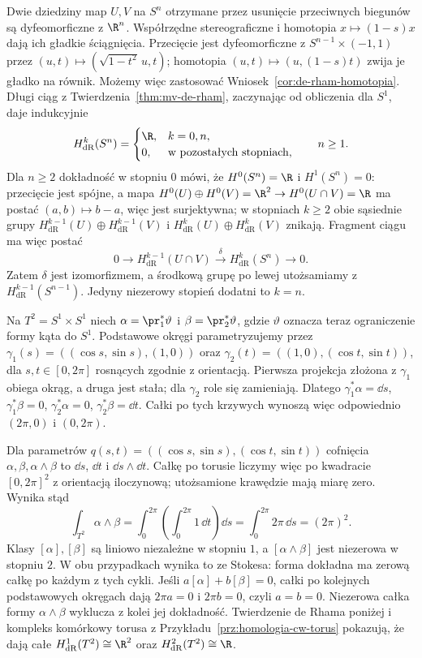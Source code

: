 \begin{przyklad}
\label{prz:de-rham-sfery-torus}
Dwie dziedziny map $U,V$ na $S^n$ otrzymane przez usunięcie
przeciwnych biegunów są dyfeomorficzne z $\R^n$.
Współrzędne stereograficzne i homotopia $x\mapsto(1-s)x$
dają ich gładkie ściągnięcia. Przecięcie jest
dyfeomorficzne z $S^{n-1}\times(-1,1)$ przez
$(u,t)\mapsto(\sqrt{1-t^2}\,u,t)$; homotopia
$(u,t)\mapsto(u,(1-s)t)$ zwija je gładko na równik.
Możemy więc zastosować
Wniosek~\ref{cor:de-rham-homotopia}.
Długi ciąg z
Twierdzenia~\ref{thm:mv-de-rham}, zaczynając od
obliczenia dla $S^1$, daje indukcyjnie
\[
 H^k_{\mathrm{dR}}(S^n)=
 \begin{cases}\R,&k=0,n,\\0,&\text{w pozostałych stopniach,}\end{cases}
 \qquad n\geq1.
\]
Dla $n\geq2$ dokładność w stopniu $0$ mówi,
że $H^0(S^n)=\R$ i $H^1(S^n)=0$:
przecięcie jest spójne, a mapa
$H^0(U)\oplus H^0(V)=\R^2\to H^0(U\cap V)=\R$
ma postać $(a,b)\mapsto b-a$, więc jest surjektywna;
w stopniach $k\geq2$ obie sąsiednie grupy
$H^{k-1}_{\mathrm{dR}}(U)\oplus H^{k-1}_{\mathrm{dR}}(V)$
i $H^k_{\mathrm{dR}}(U)\oplus H^k_{\mathrm{dR}}(V)$
znikają. Fragment ciągu ma więc postać
\[
 0\longrightarrow H^{k-1}_{\mathrm{dR}}(U\cap V)
 \xrightarrow{\delta}H^k_{\mathrm{dR}}(S^n)
 \longrightarrow0.
\]
Zatem $\delta$ jest izomorfizmem, a środkową grupę
po lewej utożsamiamy z $H^{k-1}_{\mathrm{dR}}(S^{n-1})$.
Jedyny niezerowy stopień dodatni to $k=n$.

Na $T^2=S^1\times S^1$ niech
$\alpha=\pr_1^*\vartheta$ i
$\beta=\pr_2^*\vartheta$, gdzie $\vartheta$ oznacza
teraz ograniczenie formy kąta do $S^1$.
Podstawowe okręgi parametryzujemy przez
$\gamma_1(s)=((\cos s,\sin s),(1,0))$ oraz
$\gamma_2(t)=((1,0),(\cos t,\sin t))$,
dla $s,t\in[0,2\pi]$ rosnących zgodnie z orientacją.
Pierwsza projekcja złożona z $\gamma_1$ obiega okrąg,
a druga jest stała; dla $\gamma_2$ role się zamieniają.
Dlatego $\gamma_1^*\alpha=\dd s$, $\gamma_1^*\beta=0$,
$\gamma_2^*\alpha=0$, $\gamma_2^*\beta=\dd t$.
Całki po tych krzywych wynoszą więc odpowiednio
$(2\pi,0)$ i $(0,2\pi)$.

Dla parametrów
$q(s,t)=((\cos s,\sin s),(\cos t,\sin t))$
cofnięcia $\alpha,\beta,\alpha\wedge\beta$ to $\dd s$, $\dd t$ i
$\dd s\wedge\dd t$. Całkę po torusie liczymy więc
po kwadracie $[0,2\pi]^2$ z orientacją iloczynową;
utożsamione krawędzie mają miarę zero.
Wynika stąd
\[
 \int_{T^2}\alpha\wedge\beta
 =\int_0^{2\pi}\left(\int_0^{2\pi}1\,\dd t\right)\dd s
 =\int_0^{2\pi}2\pi\,\dd s=(2\pi)^2.
\]
Klasy $[\alpha],[\beta]$ są liniowo niezależne w stopniu $1$,
a $[\alpha\wedge\beta]$ jest niezerowa w stopniu $2$.
W obu przypadkach wynika to ze Stokesa: forma dokładna
ma zerową całkę po każdym z tych cykli.
Jeśli $a[\alpha]+b[\beta]=0$, całki po kolejnych
podstawowych okręgach dają $2\pi a=0$ i $2\pi b=0$,
czyli $a=b=0$. Niezerowa całka formy $\alpha\wedge\beta$
wyklucza z kolei jej dokładność.
Twierdzenie de Rhama poniżej i kompleks komórkowy
torusa z Przykładu~\ref{prz:homologia-cw-torus}
pokazują, że dają całe
$H^1_{\mathrm{dR}}(T^2)\cong\R^2$ oraz
$H^2_{\mathrm{dR}}(T^2)\cong\R$.
\end{przyklad}


